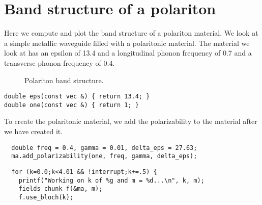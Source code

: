 \section{Band structure of a polariton}

\begin{comment}
#include <stdio.h>
#include <stdlib.h>

#include "dactyl.h"

const double rmax = 1.0;
\end{comment}

Here we compute and plot the band structure of a polariton material.  We
look at a simple metallic waveguide filled with a polaritonic material.
The material we look at has an epsilon of 13.4 and a longitudinal phonon
frequency of 0.7 and a transverse phonon frequency of 0.4.

\begin{figure}
\label{polaritonbands}
\caption{Polariton band structure.}
\end{figure}

\begin{verbatim}
double eps(const vec &) { return 13.4; }
double one(const vec &) { return 1; }
\end{verbatim}

\begin{comment}
int main(int argc, char **argv) {
  deal_with_ctrl_c();
  const int a = 10;
  const int m = 0;
  double k;
  const double ttot = 1000;  
\end{comment}

\begin{comment}
  mat_chunk ma(volcyl(rmax, 0.0, a), eps);
  const char *dirname = make_output_directory(argv[0]);
  printf("Storing output in directory %
  //FILE *ban = create_output_file(dirname, "bands");
  ma.set_output_directory(dirname);
  grace g("bands", dirname);
  g.set_range(0.0, 4.0, 0.0, 1.1);
\end{comment}

To create the polaritonic material, we add the polarizability to the
material after we have created it.

\begin{verbatim}
  double freq = 0.4, gamma = 0.01, delta_eps = 27.63;
  ma.add_polarizability(one, freq, gamma, delta_eps);
\end{verbatim}

\begin{verbatim}
  for (k=0.0;k<4.01 && !interrupt;k+=.5) {
    printf("Working on k of %g and m = %d...\n", k, m);
    fields_chunk f(&ma, m);
    f.use_bloch(k);
\end{verbatim}

